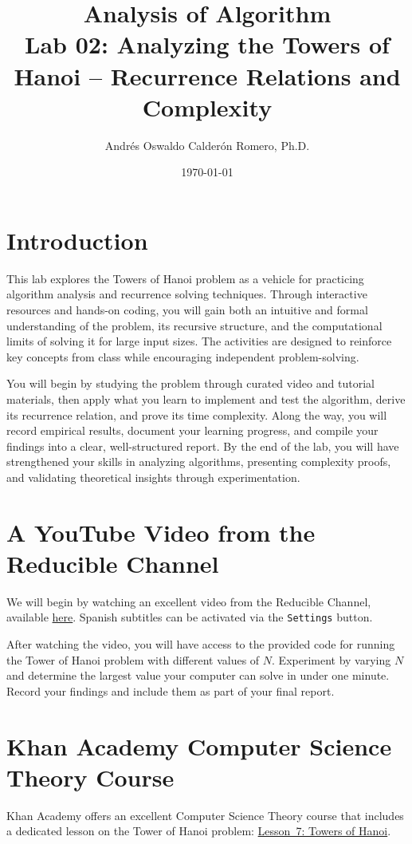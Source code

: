 \documentclass[12pt]{article}
\title{Analysis of Algorithm \\ Lab 02: Analyzing the Towers of Hanoi – Recurrence Relations and Complexity}
\author{Andrés Oswaldo Calderón Romero, Ph.D.}
\date{\today}
\begin{document}
\maketitle

\section{Introduction}
This lab explores the Towers of Hanoi problem as a vehicle for practicing algorithm analysis and recurrence solving techniques. Through interactive resources and hands-on coding, you will gain both an intuitive and formal understanding of the problem, its recursive structure, and the computational limits of solving it for large input sizes. The activities are designed to reinforce key concepts from class while encouraging independent problem-solving.

You will begin by studying the problem through curated video and tutorial materials, then apply what you learn to implement and test the algorithm, derive its recurrence relation, and prove its time complexity. Along the way, you will record empirical results, document your learning progress, and compile your findings into a clear, well-structured report. By the end of the lab, you will have strengthened your skills in analyzing algorithms, presenting complexity proofs, and validating theoretical insights through experimentation.

\section{A YouTube Video from the Reducible Channel}\label{sec:reducible}
We will begin by watching an excellent video from the Reducible Channel, available \href{https://www.youtube.com/watch?v=rf6uf3jNjbo}{here}. Spanish subtitles can be activated via the \texttt{Settings} button.

After watching the video, you will have access to the provided code for running the Tower of Hanoi problem with different values of $N$. Experiment by varying $N$ and determine the largest value your computer can solve in under one minute. Record your findings and include them as part of your final report.

\section{Khan Academy Computer Science Theory Course}\label{sec:khan}
Khan Academy offers an excellent Computer Science Theory course that includes a dedicated lesson on the Tower of Hanoi problem: \href{https://www.khanacademy.org/computing/computer-science/algorithms/towers-of-hanoi/a/towers-of-hanoi}{Lesson~7: Towers of Hanoi}.
\end{document}
